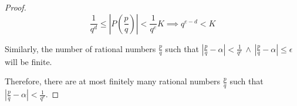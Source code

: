 \documentclass{article}
\theoremstyle{definition}\newtheorem{definition}{Definition}
\begin{document}
\begin{proof}
		$$
		\frac { 1 } { q ^ { d } } \leq \left| P \left( \frac { p } { q } \right) \right|< \frac { 1 } { q ^ { e } } K \implies q^{e-d}<K
		$$
		
		Similarly, the number of rational numbers $\frac { { p } } { q }$ such that $\left| \frac { p } { q } - \alpha \right| < \frac { 1 } { q ^ { e } } \, \land \, \left| \frac { p } { q } - \alpha \right| \leq \epsilon$  will be finite.
		
		Therefore, there are at most finitely many rational numbers $\frac { { p } } { q }$ such that $\left| \frac { p } { q } - \alpha \right| < \frac { 1 } { q ^ { e } }$.
	
	\end{proof}		
\end{document}

